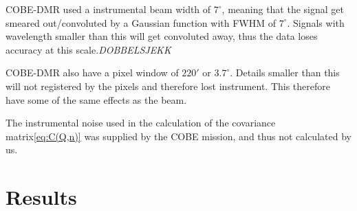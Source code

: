 \documentclass{emulateapj}
\begin{document}
COBE-DMR used a instrumental beam width of $7^\circ$, meaning that the signal get smeared out/convoluted by a Gaussian function with FWHM of $7^\circ$. Signals with wavelength smaller than this will get convoluted away, thus the data loses accuracy at this scale.\emph{DOBBELSJEKK}

COBE-DMR also have a pixel window of $220'$ or $3.7^\circ$. Details smaller than this will not registered by the pixels and therefore lost instrument. This therefore have some of the same effects as the beam.

The instrumental noise used in the calculation of the covariance matrix\eqref{eq:C(Q,n)} was supplied by the COBE mission, and thus not calculated by us.


%

\section{Results}
\label{sec:results}
\end{document}
